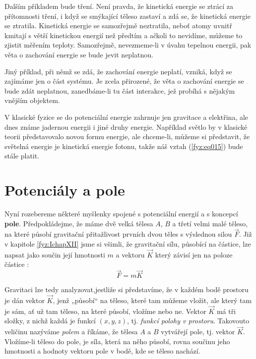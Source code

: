     Dalším příkladem bude tření. Není pravda, že kinetická energie se ztrácí za přítomnosti tření, 
    i když se smýkající těleso zastaví a zdá se, že kinetická energie se ztratila. Kinetická 
    energie se samozřejmě neztratila, neboť atomy uvnitř kmitají s větší kinetickou energií než 
    předtím a ačkoli to nevidíme, můžeme to zjistit měřením teploty. Samozřejmě, nevezmeme-li v 
    úvahu tepelnou energii, pak věta o zachování energie se bude jevit neplatnou.
    
    Jiný příklad, při němž se zdá, že zachování energie neplatí, vzniká, když se zajímáme jen o 
    část systému. Je zcela přirozené, že věta o zachování energie se bude zdát neplatnou, 
    zanedbáme-li tu část interakce, jež probíhá s nějakým vnějším objektem.
    
    V klasické fyzice se do potenciální energie zahrnuje jen gravitace a elektřina, ale dnes známe 
    jadernou energii i jiné druhy energie. Například světlo by v klasické teorii představovalo 
    novou formu energie, ale chceme-li, můžeme si představit, že světelná energie je kinetická 
    energie fotonu, takže náš vztah (\ref{fyz:eq015}) bude stále platit.
    
  \section{Potenciály a pole}
    Nyní rozebereme některé myšlenky spojené s potenciální energií a s koncepcí \textbf{pole}. 
    Předpokládejme, že máme dvě velká tělesa \(A\), \(B\) a třetí velmi malé těleso, na které 
    působí gravitační přitažlivost prvních dvou těles s výslednou silou \(\vec{F}\). Již v kapitole 
    \ref{fyz:IchapXII} jsme si všimli, že gravitační sílu, působící na částice, lze napsat 
    jako součin její hmotnosti \(m\) a vektoru \(\vec{K}\) který závisí jen na poloze 
    částice \cite[s.~204]{Feynman01}:
    \begin{equation}\label{fyz:eq001}
      \vec{F} = m \vec{K}
    \end{equation}
    
    Gravitaci lze tedy analyzovat,jestliže si představíme, že v každém bodě prostoru je dán vektor 
    \(\vec{K}\), jenž „působí“ na těleso, které tam můžeme vložit, ale který tam je sám, ať už tam 
    těleso, na které působí, vložíme nebo ne. Vektor \(\vec{K}\) má tři složky, z nichž každá je 
    funkcí \((x, y, z)\), tj. \emph{funkcí polohy v prostoru}. Takovouto veličinu nazýváme 
    \emph{polem} a říkáme, že tělesa \(A\) a \(B\) vytvářejí pole, tj.  vektor 
    \(\vec{K}\). Vložíme-li těleso do pole, je síla, která na něho působí, rovna součinu jeho 
    hmotnosti a hodnoty vektoru pole v bodě, kde se těleso nachází.
    
